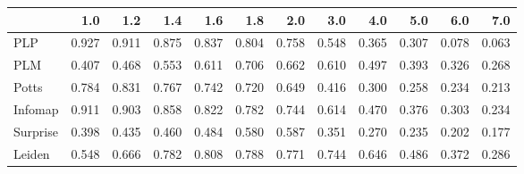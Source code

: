 \begin{tabular}{lrrrrrrrrrrr}
\toprule
{} &   1.0 &   1.2 &   1.4 &   1.6 &   1.8 &   2.0 &   3.0 &   4.0 &   5.0 &   6.0 &   7.0 \\
\midrule
PLP      & 0.927 & 0.911 & 0.875 & 0.837 & 0.804 & 0.758 & 0.548 & 0.365 & 0.307 & 0.078 & 0.063 \\
PLM      & 0.407 & 0.468 & 0.553 & 0.611 & 0.706 & 0.662 & 0.610 & 0.497 & 0.393 & 0.326 & 0.268 \\
Potts    & 0.784 & 0.831 & 0.767 & 0.742 & 0.720 & 0.649 & 0.416 & 0.300 & 0.258 & 0.234 & 0.213 \\
Infomap  & 0.911 & 0.903 & 0.858 & 0.822 & 0.782 & 0.744 & 0.614 & 0.470 & 0.376 & 0.303 & 0.234 \\
Surprise & 0.398 & 0.435 & 0.460 & 0.484 & 0.580 & 0.587 & 0.351 & 0.270 & 0.235 & 0.202 & 0.177 \\
Leiden   & 0.548 & 0.666 & 0.782 & 0.808 & 0.788 & 0.771 & 0.744 & 0.646 & 0.486 & 0.372 & 0.286 \\
\bottomrule
\end{tabular}
